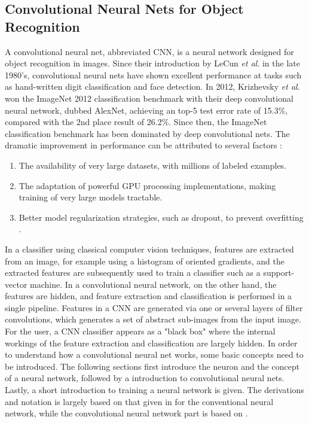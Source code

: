 \subsection{Convolutional Neural Nets for Object Recognition}
A convolutional neural net, abbreviated CNN, is a neural network designed for object recognition in images. Since their introduction by LeCun \textit{et al}. \cite{lecun-89e} in the late 1980's, convolutional neural nets have shown excellent performance at tasks such as hand-written digit classification and face detection. In 2012, Krizhevsky \textit{et al}. \cite{NIPS2012_4824} won the ImageNet 2012 classification benchmark with their deep convolutional neural network, dubbed AlexNet, achieving an top-5 test error rate of 15.3\%, compared with the 2nd place result of 26.2\%. Since then, the ImageNet classification benchmark has been dominated by deep convolutional nets. The dramatic improvement in performance can be attributed to several factors \cite{DBLP:journals/corr/ZeilerF13}:
\begin{enumerate}
	\item The availability of very large datasets, with millions of labeled examples.
	\item The adaptation of powerful GPU processing implementations, making training of very large models tractable.
	\item Better model regularization strategies, such as dropout, to prevent overfitting \cite{dropout}.
\end{enumerate}
In a classifier using classical computer vision techniques, features are extracted from an image, for example using a histogram of oriented gradients, and the extracted features are subsequently used to train a classifier such as a support-vector machine. In a convolutional neural network, on the other hand, the features are hidden, and feature extraction and classification is performed in a single pipeline. Features in a CNN are generated via one or several layers of filter convolutions, which generates a set of abstract sub-images from the input image. For the user, a CNN classifier appears as a "black box" where the internal workings of the feature extraction and classification are largely hidden. In order to understand how a convolutional neural net works, some basic concepts need to be introduced. The following sections first introduce the neuron and the concept of a neural network, followed by a introduction to convolutional neural nets. Lastly, a short introduction to training a neural network is given. The derivations and notation is largely based on that given in \cite{machine_learning} for the conventional neural network, while the convolutional neural network part is based on \cite{Goodfellow-et-al-2016}.
